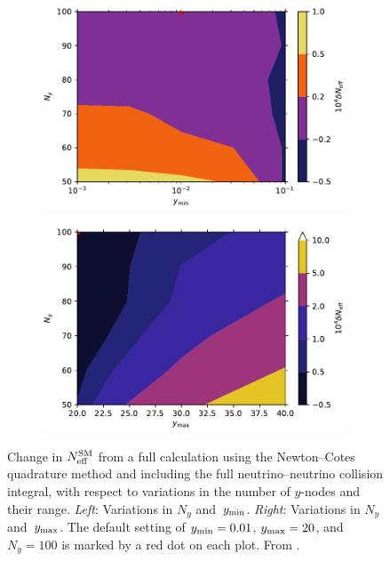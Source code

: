 \documentclass[notitlepage,nofootinbib,showpacs,preprintnumbers,amsmath,amssymb,superscriptaddress,prd,onecolumn]{revtex4-1}
\newcommand{\Neff}{\ensuremath{N_{\rm eff}}}
\begin{document}
\begin{figure}[t]
\begin{center}
\begin{subfigure}{.49\textwidth}
\centering
\includegraphics[width=\linewidth]{figures/NC_Ny_ymin.pdf}
\end{subfigure}
\begin{subfigure}{.49\textwidth}
\centering
\includegraphics[width=\linewidth]{figures/NC_Ny_ymax.pdf}
\end{subfigure}
\end{center}
\caption{Change in $\Neff^{\rm SM}$ from a full calculation using the Newton--Cotes quadrature method and including the full neutrino--neutrino collision integral,
with respect to variations in the number of $y$-nodes and their range.
{\it Left}: Variations in $N_y$ and~$y_{\rm min}$.
{\it Right}: Variations in $N_y$ and~$y_{\rm max}$.
The default setting of $y_{\rm min}=0.01$, $y_{\rm max}=20$, and $N_y = 100$ is marked by a red dot on each plot.
From \cite{Bennett:2020zkv}.
\label{fig:Ny_yrange}
}
\end{figure}
\end{document}
